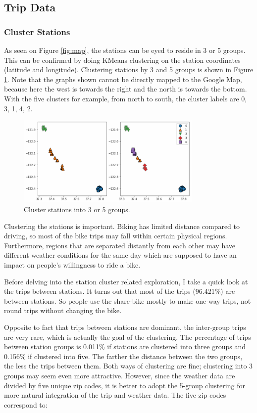 \documentclass[a4paper]{article}
\begin{document}
		
		\subsection{Trip Data}
			\subsubsection{Cluster Stations}
			As seen on Figure \ref{fig:map}, the stations can be eyed to reside in 3 or 5 groups. This can be confirmed by doing KMeans clustering on the station coordinates (latitude and longitude). Clustering stations by 3 and 5 groups is shown in Figure \ref{fig:cluster}. Note that the graphs shown cannot be directly mapped to the Google Map, because here the west is towards the right and the north is towards the bottom. With the five clusters for example, from north to south, the cluster labels are 0, 3, 1, 4, 2.
			\begin{figure}
				\centering
				\includegraphics[width=0.8\textwidth]{Clustering.png}
				\caption{\label{fig:cluster}Cluster stations into 3 or 5 groups.}
			\end{figure}
			Clustering the stations is important. Biking has limited distance compared to driving, so most of the bike trips may fall within certain physical regions. Furthermore, regions that are separated distantly from each other may have different weather conditions for the same day which are supposed to have an impact on people's willingness to ride a bike. 
			
			Before delving into the station cluster related exploration, I take a quick look at the trips between stations. It turns out that most of the trips (96.421\%) are between stations. So people use the share-bike mostly to make one-way trips, not round trips without changing the bike.
			
			Opposite to fact that trips between stations are dominant, the inter-group trips are very rare, which is actually the goal of the clustering. The percentage of trips between station groups is 0.011\% if stations are clustered into three groups and 0.156\% if clustered into five. The farther the distance between the two groups, the less the trips between them. Both ways of clustering are fine; clustering into 3 groups may seem even more attractive. However, since the weather data are divided by five unique zip codes, it is better to adopt the 5-group clustering for more natural integration of the trip and weather data. The five zip codes correspond to: 
			
\end{document}
